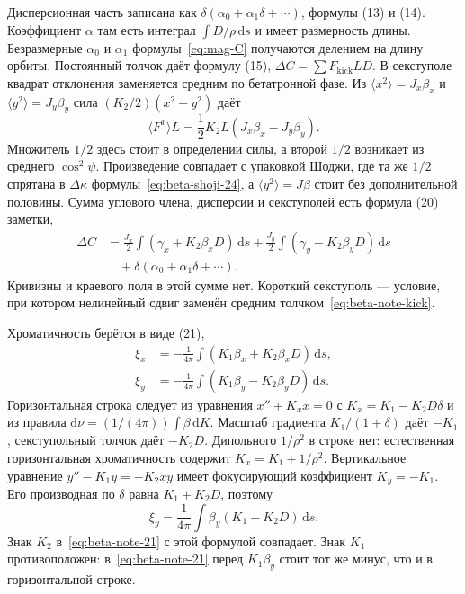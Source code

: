 Дисперсионная часть записана как $\delta(\alpha_0+\alpha_1\delta+\cdots)$, формулы (13) и (14). Коэффициент $\alpha$ там есть интеграл $\int D/\rho\,\mathrm{d}s$ и имеет размерность длины. Безразмерные $\alpha_0$ и $\alpha_1$ формулы~\eqref{eq:mag-C} получаются делением на длину орбиты. Постоянный толчок даёт формулу (15), $\Delta C=\sum F_{\mathrm{kick}} L D$. В секступоле квадрат отклонения заменяется средним по бетатронной фазе. Из $\langle x^2\rangle=J_x\beta_x$ и $\langle y^2\rangle=J_y\beta_y$ сила $(K_2/2)(x^2-y^2)$ даёт
\begin{equation}
\label{eq:beta-note-kick}
\langle F^x\rangle L
=\frac{1}{2}K_2 L(J_x\beta_x-J_y\beta_y).
\end{equation}
Множитель $1/2$ здесь стоит в определении силы, а второй $1/2$ возникает из среднего $\cos^2\psi$. Произведение совпадает с упаковкой Шоджи, где та же $1/2$ спрятана в $\Delta\kappa$ формулы~\eqref{eq:beta-shoji-24}, а $\langle y^2\rangle=J\beta$ стоит без дополнительной половины. Сумма углового члена, дисперсии и секступолей есть формула (20) заметки,
\begin{equation}
\label{eq:beta-note-20}
\begin{aligned}
\Delta C
&=\frac{J_x}{2}\int(\gamma_x+K_2\beta_x D)\,\mathrm{d}s
+\frac{J_y}{2}\int(\gamma_y-K_2\beta_y D)\,\mathrm{d}s
\\
&\quad+\delta(\alpha_0+\alpha_1\delta+\cdots).
\end{aligned}
\end{equation}
Кривизны и краевого поля в этой сумме нет. Короткий секступоль --- условие, при котором нелинейный сдвиг заменён средним толчком~\eqref{eq:beta-note-kick}.

Хроматичность берётся в виде (21),
\begin{equation}
\label{eq:beta-note-21}
\begin{aligned}
\xi_x
&=-\frac{1}{4\pi}\int(K_1\beta_x+K_2\beta_x D)\,\mathrm{d}s,
\\
\xi_y
&=-\frac{1}{4\pi}\int(K_1\beta_y-K_2\beta_y D)\,\mathrm{d}s.
\end{aligned}
\end{equation}
Горизонтальная строка следует из уравнения $x''+K_x x=0$ с $K_x=K_1-K_2 D\delta$ и из правила $\mathrm{d}\nu=(1/(4\pi))\int\beta\,\mathrm{d}K$. Масштаб градиента $K_1/(1+\delta)$ даёт $-K_1$, секступольный толчок даёт $-K_2 D$. Дипольного $1/\rho^2$ в строке нет: естественная горизонтальная хроматичность содержит $K_x=K_1+1/\rho^2$. Вертикальное уравнение $y''-K_1 y=-K_2 xy$ имеет фокусирующий коэффициент $K_y=-K_1$. Его производная по $\delta$ равна $K_1+K_2 D$, поэтому
\begin{equation}
\label{eq:beta-xi-vert}
\xi_y
=\frac{1}{4\pi}\int\beta_y(K_1+K_2 D)\,\mathrm{d}s.
\end{equation}
Знак $K_2$ в~\eqref{eq:beta-note-21} с этой формулой совпадает. Знак $K_1$ противоположен: в~\eqref{eq:beta-note-21} перед $K_1\beta_y$ стоит тот же минус, что и в горизонтальной строке.

